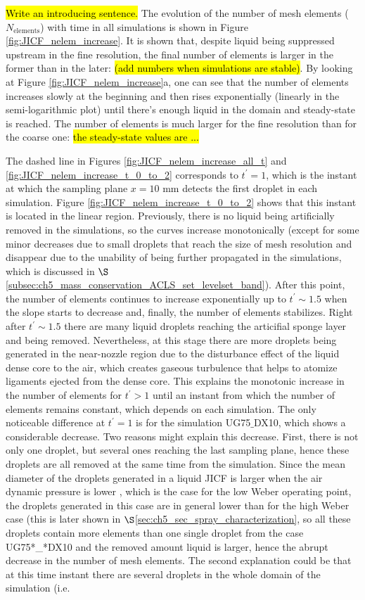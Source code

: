 \hl{Write an introducing sentence.} The evolution of the number of mesh elements ($N_\mathrm{elements}$) with time in all simulations is shown in Figure \ref{fig:JICF_nelem_increase}. It is shown that, despite liquid being suppressed upstream in the fine resolution, the final number of elements is larger in the former than in the later: \hl{(add numbers when simulations are stable)}. By looking at Figure \ref{fig:JICF_nelem_increase}a, one can see that the number of elements increases slowly at the beginning and then rises exponentially (linearly in the semi-logarithmic plot) until there’s enough liquid in the domain and steady-state is reached. The number of elements is much larger for the fine resolution than for the coarse one: \hl{the steady-state values are ... }

The dashed line in Figures \ref{fig:JICF_nelem_increase_all_t} and  \ref{fig:JICF_nelem_increase_t_0_to_2} corresponds  to $t^{\prime} = 1$, which is the instant at which the sampling plane $x = 10$ mm detects the first droplet in each simulation. Figure \ref{fig:JICF_nelem_increase_t_0_to_2} shows that this instant is located in the linear region. Previously, there is no liquid being artificially removed in the simulations, so the curves increase monotonically (except for some minor decreases due to small droplets that reach the size of mesh resolution and disappear due to the unability of being further propagated in the simulations, which is discussed in $\S$\ref{subsec:ch5_mass_conservation_ACLS_set_levelset_band}). After this point, the number of elements continues to increase exponentially up to $t^{\prime} \sim 1.5$ when the slope starts to decrease and, finally, the number of elements  stabilizes. Right after $t^{\prime} \sim 1.5$ there are many liquid droplets reaching the articifial sponge layer and being removed. Nevertheless, at this stage there are more droplets being generated in the near-nozzle region due to the disturbance effect of the liquid dense core to the air, which creates gaseous turbulence that helps to atomize ligaments ejected from the dense core. This explains the monotonic increase in the number of elements for $t^{\prime} > 1$ until an instant from which the number of elements remains constant, which depends on each simulation. The only noticeable difference at $t^{\prime} = 1$ is for the simulation UG75$\_$DX10, which shows a considerable decrease. Two reasons might explain this decrease. First, there is not only one droplet, but several ones reaching the last sampling plane, hence these droplets are all removed at the same time from the simulation. Since the mean diameter of the droplets generated in a liquid JICF is larger when the air dynamic pressure is lower , which is the case for the low Weber operating point, the droplets generated in this case are in general lower than for the high Weber case (this is later shown in $\S$\ref{sec:ch5_sec_spray_characterization}, so all these droplets contain more elements than one single droplet from the case UG75*\_*DX10 and the removed amount liquid is larger, hence the abrupt decrease in the number of mesh elements. The second explanation could be that at this time instant there are several droplets in the whole domain of the simulation (i.e. 